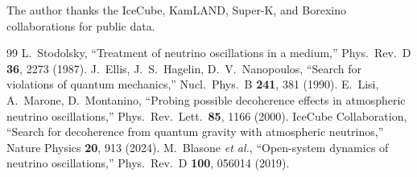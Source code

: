 \documentclass[twocolumn,prd,superscriptaddress,nofootinbib]{revtex4-2}
\begin{document}
\begin{acknowledgments}
The author thanks the IceCube, KamLAND, Super-K, and Borexino
collaborations for public data.
\end{acknowledgments}

\begin{thebibliography}{99}
 L.~Stodolsky, ``Treatment of neutrino
oscillations in a medium,''
Phys.\ Rev.\ D \textbf{36}, 2273 (1987).
 J.~Ellis, J.~S.~Hagelin,
D.~V.~Nanopoulos, ``Search for violations of quantum mechanics,''
Nucl.\ Phys.\ B \textbf{241}, 381 (1990).
 E.~Lisi, A.~Marone, D.~Montanino,
``Probing possible decoherence effects in atmospheric neutrino
oscillations,''
Phys.\ Rev.\ Lett.\ \textbf{85}, 1166 (2000).
 IceCube Collaboration,
``Search for decoherence from quantum gravity with atmospheric
neutrinos,''
Nature Physics \textbf{20}, 913 (2024).
 M.~Blasone \textit{et al.},
``Open-system dynamics of neutrino oscillations,''
Phys.\ Rev.\ D \textbf{100}, 056014 (2019).
\end{thebibliography}
\end{document}
